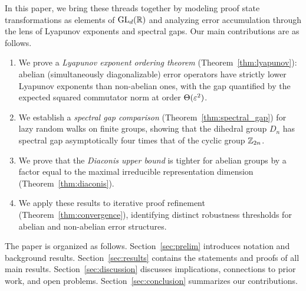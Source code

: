 In this paper, we bring these threads together by modeling proof state
transformations as elements of $\operatorname{GL}_d(\mathbb{R})$ and analyzing error accumulation
through the lens of Lyapunov exponents and spectral gaps.  Our main
contributions are as follows.

\begin{enumerate}[leftmargin=*,itemsep=2pt,topsep=4pt]
\item We prove a \emph{Lyapunov exponent ordering theorem}
  (Theorem~\ref{thm:lyapunov}): abelian (simultaneously diagonalizable)
  error operators have strictly lower Lyapunov exponents than non-abelian
  ones, with the gap quantified by the expected squared commutator norm
  at order $\Theta(\varepsilon^2)$.

\item We establish a \emph{spectral gap comparison}
  (Theorem~\ref{thm:spectral_gap}) for lazy random walks on finite
  groups, showing that the dihedral group $D_n$ has spectral gap
  asymptotically four times that of the cyclic group $\mathbb{Z}_{2n}$.

\item We prove that the \emph{Diaconis upper bound} is tighter for abelian
  groups by a factor equal to the maximal irreducible representation
  dimension (Theorem~\ref{thm:diaconis}).

\item We apply these results to iterative proof refinement
  (Theorem~\ref{thm:convergence}), identifying distinct robustness
  thresholds for abelian and non-abelian error structures.
\end{enumerate}

The paper is organized as follows.  Section~\ref{sec:prelim} introduces
notation and background results.  Section~\ref{sec:results} contains the
statements and proofs of all main results.  Section~\ref{sec:discussion}
discusses implications, connections to prior work, and open problems.
Section~\ref{sec:conclusion} summarizes our contributions.
